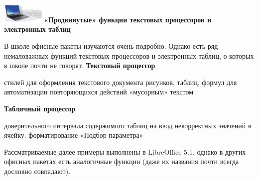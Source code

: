 \documentclass[aspectratio=169]{beamer}
\begin{document}
\begin{frame}
\Large
\includegraphics[width=2cm]{logo} {\bf «Продвинутые» функции текстовых процессоров и электронных таблиц}
\footnotesize

В школе офисные пакеты изучаются очень подробно. Однако есть ряд немаловажных
функций текстовых процессоров и электронных таблиц, о которых в школе почти не говорят.
{\bf Текстовый процессор}
\begin{itemize}
 стилей для оформления текстового документа
 рисунков, таблиц, формул
 для автоматизации повторяющихся действий
 «мусорным» текстом
\end{itemize}
{\bf Табличный процессор}
\begin{itemize}
 доверительного интервала
 содержимого таблиц
 на ввод некорректных значений в ячейку.
 форматирование
 «Подбор параметра»
\end{itemize}
Рассматриваемые далее примеры выполнены в LibreOffice 5.1, однако в других офисных
пакетах есть аналогичные функции (даже их названия почти всегда дословно совпадают).
\end{frame}
\end{document}
